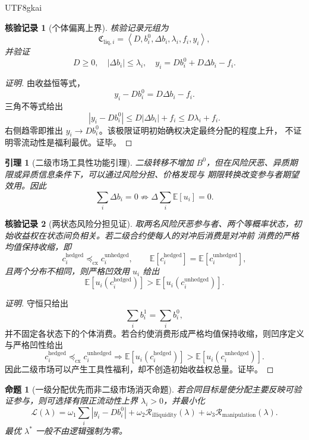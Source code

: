 \documentclass[12pt,a4paper,openany]{report}
\newtheorem{lemma}{引理}[chapter]
\newtheorem{proposition}{命题}[chapter]
\newtheorem{Certificate}{核验记录}[chapter]
\newcommand{\EE}{\mathbb E}
\newcommand{\Abs}[1]{\left\lvert #1\right\rvert}
\newcommand{\Tuple}[1]{\left\langle #1\right\rangle}
\begin{document}
\begin{CJK*}{UTF8}{gkai}
\begin{Certificate}[个体偏离上界]
核验记录元组为
\[
  \mathfrak C_{\mathrm{liq},i}
  =
  \Tuple{D,b_i^0,\Delta b_i,\lambda_i,f_i,y_i},
\]
并验证
\[
  D\ge0,\quad \Abs{\Delta b_i}\le\lambda_i,\quad
  y_i=Db_i^0+D\Delta b_i-f_i.
\]
\end{Certificate}

\begin{proof}[证明]
由收益恒等式，
\[
  y_i-Db_i^0=D\Delta b_i-f_i.
\]
三角不等式给出
\[
  \Abs{y_i-Db_i^0}
  \le D\Abs{\Delta b_i}+f_i
  \le D\lambda_i+f_i.
\]
右侧趋零即推出 \(y_i\to Db_i^0\)。该极限证明初始确权决定最终分配的程度上升，
不证明零流动性是福利最优。证毕。
\end{proof}

\begin{lemma}[二级市场工具性功能引理]
\label{lem:secondary-market-instrumental-functions}
二级转移不增加 \(B^0\)，但在风险厌恶、异质期限或异质信息条件下，可以通过风险分担、价格发现与
期限转换改变参与者期望效用。因此
\[
  \sum_i\Delta b_i=0
  \not\Longrightarrow
  \Delta\sum_i\EE[u_i]=0.
\]
\end{lemma}

\begin{Certificate}[两状态风险分担见证]
取两名风险厌恶参与者、两个等概率状态，初始收益权在状态间负相关。若二级合约使每人的对冲后消费是对冲前
消费的严格均值保持收缩，即
\[
  c_i^{\mathrm{hedged}}\preceq_{\mathrm{cx}}c_i^{\mathrm{unhedged}},
  \qquad
  \EE[c_i^{\mathrm{hedged}}]=\EE[c_i^{\mathrm{unhedged}}],
\]
且两个分布不相同，则严格凹效用 \(u_i\) 给出
\[
  \EE[u_i(c_i^{\mathrm{hedged}})]
  >
  \EE[u_i(c_i^{\mathrm{unhedged}})].
\]
\end{Certificate}

\begin{proof}[证明]
守恒只给出
\[
  \sum_i b_i^1=\sum_i b_i^0,
\]
并不固定各状态下的个体消费。若合约使消费形成严格均值保持收缩，则凹序定义与严格凹性给出
\[
  c_i^{\mathrm{hedged}}\preceq_{\mathrm{cx}}c_i^{\mathrm{unhedged}}
  \Longrightarrow
  \EE[u_i(c_i^{\mathrm{hedged}})]
  >\EE[u_i(c_i^{\mathrm{unhedged}})].
\]
因此二级市场可以产生工具性福利，却不创造初始收益权总量。证毕。
\end{proof}

\begin{proposition}[一级分配优先而非二级市场消灭命题]
\label{prop:primary-priority-not-elimination}
若合同目标是使分配主要反映可验证参与，则可选择有限正流动性上界 \(\lambda_i>0\)，并最小化
\[
  \mathcal L(\lambda)
  =
  \omega_1\sum_i\Abs{y_i-Db_i^0}
  +\omega_2\mathcal R_{\mathrm{illiquidity}}(\lambda)
  +\omega_3\mathcal R_{\mathrm{manipulation}}(\lambda).
\]
最优 \(\lambda^*\) 一般不由逻辑强制为零。
\end{proposition}


\end{CJK*}
\end{document}
